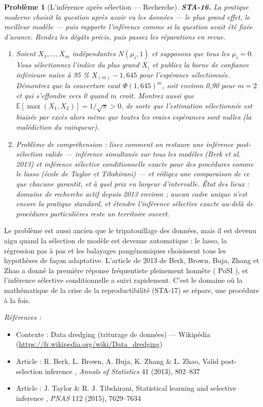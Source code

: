 \documentclass[11pt]{article}
\newtheorem{problem}{Problème}
\newenvironment{refs}{\par\small\noindent\emph{Références :}\begin{itemize}\setlength\itemsep{0pt}}{\end{itemize}\normalsize}
\begin{document}
\begin{problem}[{L'inférence après sélection --- Recherche}]
\textbf{STA-16.} La pratique moderne choisit la question après avoir vu les données --- le plus
grand effet, le meilleur modèle --- puis rapporte l'inférence comme si la question avait été fixée
d'avance. Rendez les dégâts précis, puis passez les réparations en revue.
\begin{enumerate}
\item[(a)] Soient $ X_1, \dots, X_m $ indépendantes $ N(\mu_i, 1) $ et supposons que tous les
$ \mu_i = 0 $. Vous sélectionnez l'indice du plus grand $ X_i $ et publiez la borne de confiance
inférieure naïve à 95 \% $ X_{(m)} - 1{,}645 $ pour l'espérance sélectionnée. Démontrez que la
couverture vaut $ \Phi(1{,}645)^m $, soit environ 0,90 pour $ m = 2 $ et qui s'effondre vers 0
quand $ m $ croît. Montrez aussi que
$ \mathbb{E}[\max(X_1, X_2)] = 1/\sqrt{\pi} >0 $, de sorte que l'estimation sélectionnée est
biaisée par excès alors même que toutes les vraies espérances sont nulles (la malédiction du
vainqueur).
\item[(b)] Problème de compréhension : lisez comment on restaure une inférence post-sélection valide ---
inférence simultanée sur tous les modèles (Berk et al. 2013) et \og{} inférence sélective \fg{}
conditionnelle exacte pour des procédures comme le lasso (école de Taylor et Tibshirani) --- et
rédigez une comparaison de ce que chacune garantit, et à quel prix en largeur d'intervalle.
\textit{État des lieux : domaine de recherche actif depuis 2013 environ ; aucun cadre unique n'est
encore la pratique standard, et étendre l'inférence sélective exacte au-delà de procédures
particulières reste un territoire ouvert.}
\end{enumerate}

\end{problem}

\noindent Le problème est aussi ancien que le tripatouillage des données, mais il est
devenu aigu quand la sélection de modèle est devenue automatique : le lasso, la régression pas à
pas et les balayages pangénomiques choisissent tous les hypothèses de façon adaptative. L'article
de 2013 de Berk, Brown, Buja, Zhang et Zhao a donné la première réponse fréquentiste pleinement
honnête (\og{} PoSI \fg{}), et l'inférence sélective conditionnelle a suivi rapidement. C'est le domaine où
la mathématique de la crise de la reproductibilité (STA-17) se répare, une procédure à la fois.

\begin{refs}
\item Contexte : Data dredging (triturage de données) --- Wikipédia (\url{https://fr.wikipedia.org/wiki/Data_dredging})
\item Article : R. Berk, L. Brown, A. Buja, K. Zhang \& L. Zhao, \og{} Valid post-selection inference \fg{}, \textit{Annals of Statistics} 41 (2013), 802--837
\item Article : J. Taylor \& R. J. Tibshirani, \og{} Statistical learning and selective inference \fg{}, \textit{PNAS} 112 (2015), 7629--7634
\end{refs}
\end{document}
